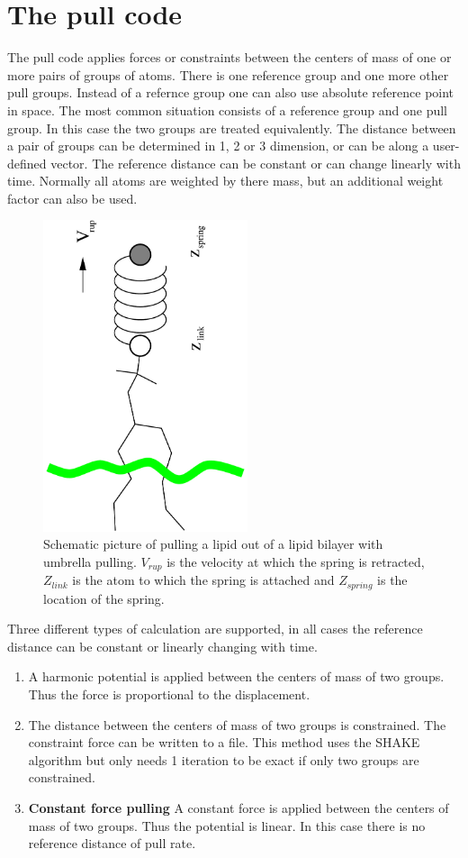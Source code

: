 \section{The pull code}
\label{sec:pull}
The pull code applies forces or constraints between the centers
of mass of one or more pairs of groups of atoms.
There is one reference group and one more other pull groups.
Instead of a refernce group one can also use absolute reference
point in space.
The most common situation consists of a reference group
and one pull group. In this case the two groups are treated
equivalently.
The distance between a pair of groups can be determined
in 1, 2 or 3 dimension, or can be along a user-defined vector.
The reference distance can be constant or can change linearly with time.
Normally all atoms are weighted by there mass, but an additional
weight factor can also be used.
\begin{figure}
\centerline{\includegraphics[width=6cm,angle=270]{plots/pull}}
\caption{Schematic picture of pulling a lipid out of a lipid bilayer
with umbrella pulling. $V_{rup}$ is the velocity at which the spring is
retracted, $Z_{link}$ is the atom to which the spring is attached and
$Z_{spring}$ is the location of the spring.}
\label{fi:pull} 
\end{figure}

Three different types of calculation are supported,
in all cases the reference distance can be constant
or linearly changing with time.
\begin{enumerate}
\item{\textbf{}}
A harmonic potential is applied between
the centers of mass of two groups.
Thus the force is proportional to the displacement.
\item{\textbf{}}
The distance between the centers of mass of two groups is constrained.
The constraint force can be written to a file.
This method uses the SHAKE algorithm but only needs 1 iteration to be
exact if only two groups are constrained. 
\item{\textbf{Constant force pulling}}
A constant force is applied between the centers of mass of two groups.
Thus the potential is linear.
In this case there is no reference distance of pull rate.
\end{enumerate}

